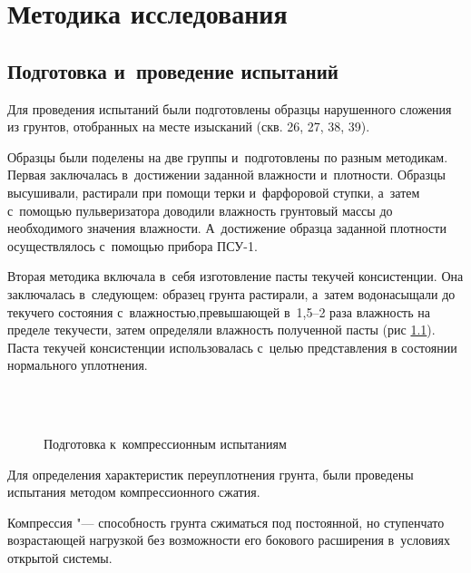 \chapter{Методика исследования}

\section{Подготовка и~проведение испытаний}


Для проведения испытаний были подготовлены образцы нарушенного сложения из грунтов, отобранных на месте изысканий (скв. 26, 27, 38, 39).

 Образцы были поделены на две группы и~подготовлены по разным методикам.
 Первая заключалась в~достижении заданной влажности и~плотности. Образцы высушивали, растирали при помощи терки и~фарфоровой ступки, а~затем с~помощью пульверизатора доводили влажность грунтовый массы до необходимого значения влажности. А~достижение образца заданной плотности осуществлялось с~помощью прибора ПСУ-1.

Вторая методика включала в~себя изготовление пасты текучей консистенции. Она заключалась в~следующем: образец грунта растирали, а~затем водонасыщали до текучего состояния с~влажностью,превышающей в~1,5--2 раза влажность на пределе текучести, затем определяли влажность полученной пасты (рис \ref{eq:pst}). 
Паста текучей консистенции использовалась с~целью представления в состоянии нормального уплотнения.


\begin{figure}[ht]
  {\centering
       \hfill
      \\
      \\
  }
  \caption{Подготовка к~компрессионным испытаниям}
  \label{eq:pst}
\end{figure}

Для определения характеристик переуплотнения грунта, были проведены испытания методом компрессионного сжатия. 

Компрессия "--- способность грунта сжиматься под постоянной, но ступенчато возрастающей нагрузкой без возможности его бокового расширения в~условиях открытой системы.

